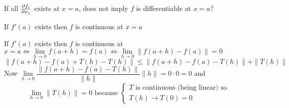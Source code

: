 If all $\frac{\partial f_i}{\partial x_j}$ exists at $x=a$, does not imply  $f$ is differentiable at $x=a$?
\begin{Theorem}{}{}
	If $f'(a)$ exists then $f$ is continuous at $x=a$
\end{Theorem}
\begin{myproof}
	If $f'(a)$ exists then $f$ is continuous at $x=a\iff\lim\limits_{h\to 0}f(a+h)=f(a)\iff\lim\limits_{h\to 0}\|f(a+h)-f(a)\|=0$
	$$\|f(a+h)-f(a)+T(h)-T(h)\|\leq \|f(a+h)-f(a)-T(h)\|+\|T(h)\|$$Now $\lim\limits_{h\to 0}\dfrac{\|f(a+h)-f(a)-T(h)\|}{\|h\|}\|h\|=0\cdot 0=0$ and $$\lim_{h\to 0}\|T(h)\|=0\text{ because }\begin{cases*}
		T\text{ is continuous (being linear) so}\\
		T(h)\to T(0)=0
	\end{cases*}$$
\end{myproof}